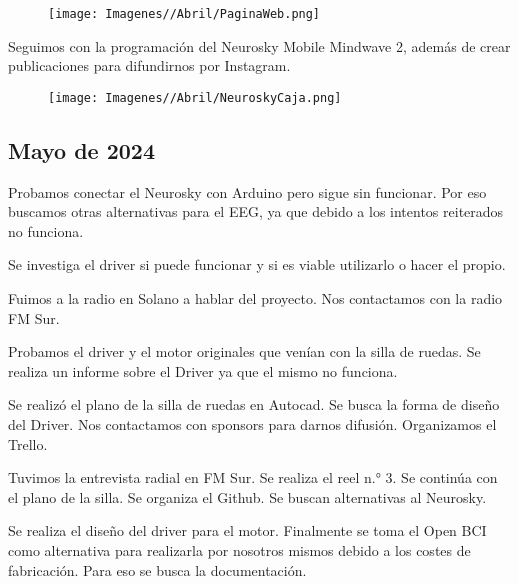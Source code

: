 \documentclass{article}
\begin{document}
\begin{figure}[H]
    \centering
    \texttt{[image: Imagenes//Abril/PaginaWeb.png]}
\end{figure}

Seguimos con la programación del Neurosky Mobile Mindwave 2, además de crear publicaciones para difundirnos por Instagram.

\begin{figure}[H]
    \centering
    \texttt{[image: Imagenes//Abril/NeuroskyCaja.png]}
\end{figure}

\newpage


\begin{center}
    \section{Mayo de 2024}
\end{center}

Probamos conectar el Neurosky con Arduino pero sigue sin funcionar. Por eso buscamos otras alternativas para el EEG, ya que debido a los intentos reiterados no funciona.




Se investiga el driver si puede funcionar y si es viable utilizarlo o hacer el propio.




Fuimos a la radio en Solano a hablar del proyecto. Nos contactamos con la radio FM Sur.




Probamos el driver y el motor originales que venían con la silla de ruedas. Se realiza un informe sobre el Driver ya que el mismo no funciona.





Se realizó el plano de la silla de ruedas en Autocad. Se busca la forma de diseño del Driver. Nos contactamos con sponsors para darnos difusión. Organizamos el Trello.





Tuvimos la entrevista radial en FM Sur. Se realiza el reel n.° 3. Se continúa con el plano de la silla. Se organiza el Github. Se buscan alternativas al Neurosky. 





Se realiza el diseño del driver para el motor. Finalmente se toma el Open BCI como alternativa para realizarla por nosotros mismos debido a los costes de fabricación. Para eso se busca la documentación.
\end{document}
